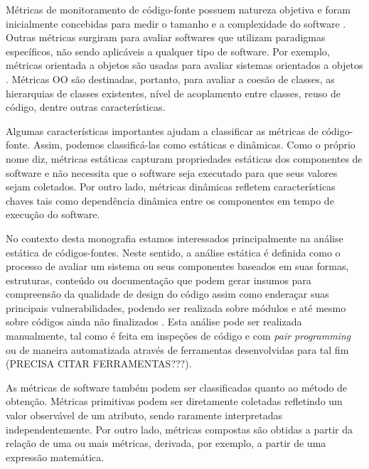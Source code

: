 Métricas de monitoramento de código-fonte possuem natureza objetiva e foram inicialmente concebidas para medir o tamanho e a complexidade do software \cite{henry1984kafura}\cite{troy1981zweben}\cite{yau1985zweben}. Outras métricas surgiram para avaliar softwares que utilizam paradigmas específicos, não sendo aplicáveis a qualquer tipo de software. Por exemplo, métricas orientada a objetos são usadas para avaliar sistemas orientados a objetos \cite{systa2000}. Métricas OO são destinadas, portanto, para avaliar a coesão de classes, as hierarquias de classes existentes, nível de acoplamento entre classes, reuso de código, dentre outras características.

%

Algumas características importantes ajudam a classificar as métricas de código-fonte. Assim, podemos classificá-las como estáticas e dinâmicas. Como o próprio nome diz, métricas estáticas capturam propriedades estáticas dos componentes de software e não necessita que o software seja executado para que seus valores sejam coletados. Por outro lado, métricas dinâmicas refletem características chaves tais como dependência dinâmica entre os componentes em tempo de execução do software.

%

No contexto desta monografia estamos interessados principalmente na análise estática de códigos-fontes. Neste sentido, a análise estática é definida como o processo de avaliar um sistema ou seus componentes baseados em suas formas, estruturas, conteúdo ou documentação que podem gerar insumos para compreensão da qualidade de design do código assim como enderaçar suas principais vulnerabilidades, podendo ser realizada sobre módulos e até mesmo sobre códigos ainda não finalizados \cite{black2009}. Esta análise pode ser realizada manualmente, tal como é feita em inspeções de código e com \emph{pair programming} ou de maneira automatizada através de ferramentas desenvolvidas para tal fim (PRECISA CITAR FERRAMENTAS???). 

%

As métricas de software também podem ser classificadas quanto ao método de obtenção. Métricas primitivas podem ser diretamente coletadas refletindo um valor observável de um atributo, sendo raramente interpretadas independentemente. Por outro lado, métricas compostas são obtidas a partir da relação de uma ou mais métricas, derivada, por exemplo, a partir de uma expressão matemática.

%

